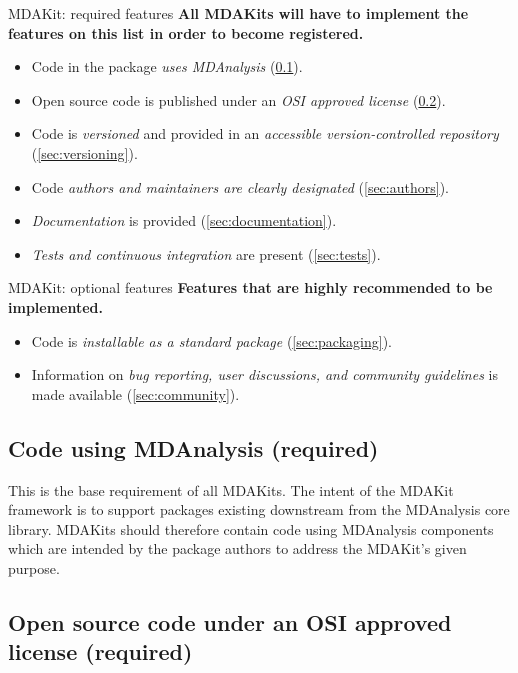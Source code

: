 \documentclass[9pt,whitepaper]{livecoms}
\begin{document}
\begin{Checklists}
\begin{checklist}{MDAKit: required features}
\textbf{All MDAKits will have to implement the features on this list in order to become registered.}
\begin{itemize}
\item Code in the package \emph{uses MDAnalysis} (\ref{sec:usesmdanalysis}).
\item Open source code is published under an \emph{OSI approved license} (\ref{sec:opensource}).
\item Code is \emph{versioned} and provided in an \emph{accessible version-controlled repository} (\ref{sec:versioning}).
\item Code \emph{authors and maintainers are clearly designated} (\ref{sec:authors}).
\item \emph{Documentation} is provided (\ref{sec:documentation}).
\item \emph{Tests and continuous integration} are present (\ref{sec:tests}).
\end{itemize}
\end{checklist}

\begin{checklist}{MDAKit: optional features}
\textbf{Features that are highly recommended to be implemented.}
\begin{itemize}
\item Code is \emph{installable as a standard package} (\ref{sec:packaging}).
\item Information on \emph{bug reporting, user discussions, and community guidelines} is made available (\ref{sec:community}).
\end{itemize}
\end{checklist}
\end{Checklists}

 
\subsection{Code using MDAnalysis (required)}
\label{sec:usesmdanalysis}

This is the base requirement of all MDAKits. The intent of the MDAKit framework is to support packages existing downstream from the MDAnalysis core library. MDAKits should therefore contain code using MDAnalysis components which are intended by the package authors to address the MDAKit’s given purpose.
 
\subsection{Open source code under an OSI approved license (required)}
\label{sec:opensource}
\end{document}

